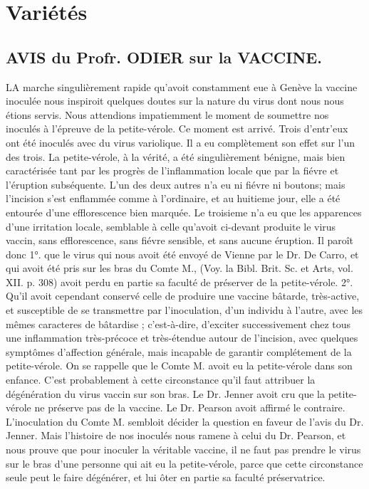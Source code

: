 \setcounter{page}{417}
\chapter{Variétés}
\section{AVIS du Profr. ODIER sur la VACCINE.}
LA marche singulièrement rapide qu'avoit constamment eue à Genève la vaccine inoculée nous inspiroit quelques doutes sur la nature du virus dont nous nous étions servis. Nous attendions impatiemment le moment de soumettre nos inoculés à l'épreuve de la petite-vérole. Ce moment est arrivé. Trois d'entr'eux ont été inoculés avec du virus variolique. Il a eu complètement son effet sur l'un des trois. La petite-vérole, à la vérité, a été singulièrement bénigne, mais bien caractérisée tant par les progrès de l'inflammation locale que par la fiévre et l'éruption subséquente. L'un des deux autres n'a eu ni fiévre ni boutons; mais l'incision s'est enflammée comme à l'ordinaire, et au huitieme jour, elle a été entourée d'une efflorescence bien marquée. Le troisieme n'a eu que les apparences d'une irritation locale, semblable à celle qu'avoit ci-devant produite le virus vaccin, sans efflorescence, sans fiévre sensible, et sans aucune éruption.
\setcounter{page}{418}
Il paroît donc 1°. que le virus qui nous avoit été envoyé de Vienne par le Dr. De Carro, et qui avoit été pris sur les bras du Comte M., (Voy. la Bibl. Brit. Sc. et Arts, vol. XII. p. 308) avoit perdu en partie sa faculté de préserver de la petite-vérole. 2°. Qu'il avoit cependant conservé celle de produire une vaccine bâtarde, très-active, et susceptible de se transmettre par l'inoculation, d'un individu à l'autre, avec les mêmes caracteres de bâtardise ; c'est-à-dire, d'exciter successivement chez tous une inflammation très-précoce et très-étendue autour de l'incision, avec quelques symptômes d'affection générale, mais incapable de garantir complétement de la petite-vérole.
On se rappelle que le Comte M. avoit eu la petite-vérole dans son enfance. C'est probablement à cette circonstance qu'il faut attribuer la dégénération du virus vaccin sur son bras. Le Dr. Jenner avoit cru que la petite-vérole ne préserve pas de la vaccine. Le Dr. Pearson avoit affirmé le contraire. L'inoculation du Comte M. sembloit décider la question en faveur de l'avis du Dr. Jenner. Mais l'histoire de nos inoculés nous ramene à celui du Dr. Pearson, et nous prouve que pour inoculer la véritable vaccine, il ne faut pas prendre le virus sur le bras d'une personne qui ait eu la petite-vérole, parce que cette circonstance seule peut le faire dégénérer, et lui ôter en partie sa faculté préservatrice.
